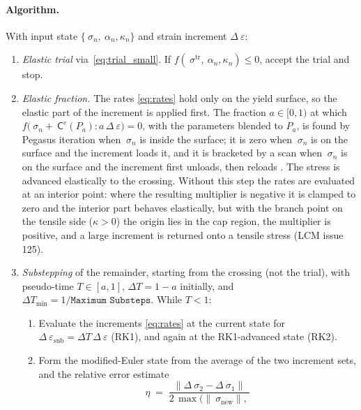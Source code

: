 \documentclass[12pt]{article}
\newcommand{\stress}{~\sigma}
\newcommand{\backstress}{~\alpha}
\newcommand{\strainincr}{\Delta~\varepsilon}
\newcommand{\Celast}{{~{\mathsf C}^e}}
\begin{document}
\paragraph{Algorithm.}
With input state $\{\stress_n, \backstress_n, \kappa_n\}$ and strain
increment $\strainincr$:
\begin{enumerate}
\item \emph{Elastic trial} via~\eqref{eq:trial_small}. If
      $f(\stress^{\mathrm{tr}}, \backstress_n, \kappa_n) \le 0$,
      accept the trial and stop.
\item \emph{Elastic fraction.} The rates \eqref{eq:rates} hold only
      on the yield surface, so the elastic part of the increment is
      applied first. The fraction $a \in [0,1)$ at which
      $f\big(\stress_n + \Celast(P_a) : a\,\strainincr\big) = 0$,
      with the parameters blended to $P_a$, is found by Pegasus
      iteration when $\stress_n$ is inside the surface; it is zero when
      $\stress_n$ is on the surface and the increment loads it, and it
      is bracketed by a scan when $\stress_n$ is on the surface and the
      increment first unloads, then reloads
      \citep{Sloan.Abbo.Sheng:2001}. The stress is advanced elastically
      to the crossing. Without this step the rates are evaluated at an
      interior point: where the resulting multiplier is negative it is
      clamped to zero and the interior part behaves elastically, but
      with the branch point on the tensile side ($\kappa > 0$) the
      origin lies in the cap region, the multiplier is positive, and a
      large increment is returned onto a tensile stress (LCM issue 125).
\item \emph{Substepping} of the remainder, starting from the crossing
      (not the trial), with pseudo-time $T \in [a,1]$,
      $\Delta T = 1 - a$ initially, and
      $\Delta T_{\min} = 1/\texttt{Maximum Substeps}$.
      While $T < 1$:
      \begin{enumerate}
      \item Evaluate the increments \eqref{eq:rates} at the current
            state for $\strainincr_{\mathrm{sub}}
            = \Delta T\,\strainincr$ (RK1), and again at the
            RK1-advanced state (RK2).
      \item Form the modified-Euler state from the average of the two
            increment sets, and the relative error estimate
            \begin{equation}
              \eta \;=\; \frac{\|\Delta\stress_2 - \Delta\stress_1\|}
                           {2\,\max(\|\stress_{\mathrm{new}}\|,\,
}
\end{equation}
\end{enumerate}
\end{enumerate}
\end{document}
